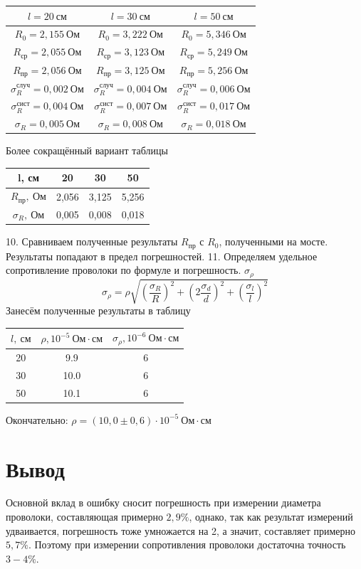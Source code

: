 \documentclass[a4paper, 12pt]{article}
\begin{document}
		\begin{longtable}[H]{|c||c||c|}
			\hline
			$l = 20\: см$ & $l = 30\: см$ & $l = 50\: см$ \\
			\hline
			$R_0 = 2,155\: Ом$ & $R_0 = 3,222\: Ом$ & $R_0 = 5,346\: Ом$ \\
			$R_{ср} = 2,055\: Ом$ & $R_{ср} = 3,123\: Ом$ & $R_{ср} = 5,249\: Ом$ \\
			$R_{пр} = 2,056\: Ом$ & $R_{пр} = 3,125\: Ом$ & $R_{пр} = 5,256\: Ом$ \\
			$\sigma_R^{случ} = 0,002\: Ом$ & $\sigma_R^{случ} = 0,004\: Ом$ & $\sigma_R^{случ} = 0,006\: Ом$ \\
			$\sigma_R^{сист} = 0,004\: Ом$ & $\sigma_R^{сист} = 0,007\: Ом$ & $\sigma_R^{сист} = 0,017\: Ом$ \\
			$\sigma_R = 0,005\: Ом$ & $\sigma_R = 0,008\: Ом$ & $\sigma_R = 0,018\: Ом$ \\
			\hline
		\end{longtable}
		Более сокращённый вариант таблицы
		\begin{longtable}[H]{|c|c|c|c|}
			\hline
			l, см & 20 & 30 & 50 \\
			\hline
			$R_{пр},\: Ом$ & 2,056 & 3,125 & 5,256 \\
			\hline
			$\sigma_{R},\: Ом$ & 0,005 & 0,008 & 0,018 \\
			\hline
		\end{longtable}
		10. Сравниваем полученные результаты $R_{пр}$ с $R_0$, полученными на мосте. Результаты попадают в предел погрешностей.
		11. Определяем удельное сопротивление проволоки по формуле и погрешность. $\sigma_{\rho}$
		$$\sigma_{\rho}=\rho \sqrt{(\frac{\sigma_R}{R})^2 + (2 \frac{\sigma_d}{d})^2 + (\frac{\sigma_l}{l})^2}$$
		Занесём полученные результаты в таблицу
		\begin{longtable}[H]{|c|c|c|}
			\hline
			$l,\: см$ & $\rho, 10^{-5}\: Ом \cdot см$ & $\sigma_{\rho}, 10^{-6}\: Ом \cdot см$ \\
			\hline
			20 & 9.9 & 6 \\
			30 & 10.0 & 6 \\
			50 & 10.1 & 6 \\
			\hline
		\end{longtable}
		Окончательно: $\rho = (10,0 \pm 0,6) \cdot 10^{-5}\: Ом \cdot см$
	\section*{Вывод}
		Основной вклад в ошибку сносит погрешность при измерении диаметра проволоки, составляющая примерно $2,9\%$, однако, так как результат измерений удваивается, погрешность тоже умножается на 2, а значит, составляет примерно $5,7\%$. Поэтому при измерении сопротивления проволоки достаточна точность $3-4\%$.
		
\end{document}
